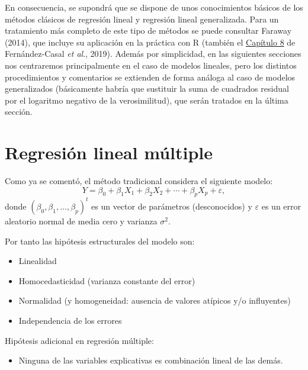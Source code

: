 \documentclass[
]{book}
\providecommand{\tightlist}{%
  \setlength{\itemsep}{0pt}\setlength{\parskip}{0pt}}
\theoremstyle{break}
\theoremstyle{definition}
\theoremstyle{definition}
\theoremstyle{definition}
\theoremstyle{remark}
\begin{document}
En consecuencia, se supondrá que se dispone de unos conocimientos básicos de los métodos clásicos de regresión lineal y regresión lineal generalizada.
Para un tratamiento más completo de este tipo de métodos se puede consultar Faraway (2014), que incluye su aplicación en la práctica con R (también el \href{https://rubenfcasal.github.io/intror/modelos-lineales.html}{Capítulo 8} de Fernández-Casal \emph{et al}., 2019).
Además por simplicidad, en las siguientes secciones nos centraremos principalmente en el caso de modelos lineales, pero los distintos procedimientos y comentarios se extienden de forma análoga al caso de modelos generalizados (básicamente habría que sustituir la suma de cuadrados residual por el logaritmo negativo de la verosimilitud), que serán tratados en la última sección.

\hypertarget{reg-multiple}{%
\section{Regresión lineal múltiple}\label{reg-multiple}}

Como ya se comentó, el método tradicional considera el siguiente modelo:
\begin{equation} 
  Y = \beta_{0}+\beta_{1}X_{1}+\beta_{2}X_{2}+\cdots+\beta_{p}X_{p} + \varepsilon,
  \label{eq:modelo-rlm}
\end{equation}
donde \(\left( \beta_{0},\beta_{1},\ldots,\beta_{p}\right)^t\) es un vector de parámetros (desconocidos) y \(\varepsilon\) es un error aleatorio normal de media cero y varianza \(\sigma^2\).

Por tanto las hipótesis estructurales del modelo son:

\begin{itemize}
\item
  Linealidad
\item
  Homocedasticidad (varianza constante del error)
\item
  Normalidad (y homogeneidad: ausencia de valores atípicos y/o influyentes)
\item
  Independencia de los errores
\end{itemize}

Hipótesis adicional en regresión múltiple:

\begin{itemize}
\tightlist
\item
  Ninguna de las variables explicativas es combinación lineal de las demás.
\end{itemize}
\end{document}
